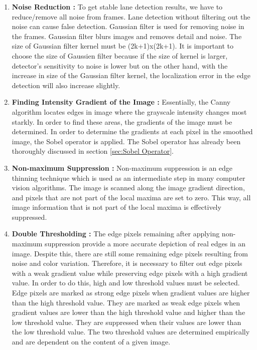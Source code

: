\begin{enumerate}
\item \textbf{Noise Reduction : } To get stable lane detection results, we have to reduce/remove all noise from frames. Lane detection without filtering out the noise can cause false detection. Gaussian filter is used for removing noise in the frames. Gaussian filter blurs images and removes detail and noise. The size of Gaussian filter kernel must be (2k+1)x(2k+1). It is important to choose the size of Gaussien filter because if the size of kernel is larger, detector's sensitivity to noise is lower but on the other hand, with the increase in size of the Gaussian filter kernel, the localization error in the edge detection will also increase slightly. \cite{Canny_Edge_Detector}



\item \textbf{Finding Intensity Gradient of the Image : } Essentially, the Canny algorithm locates edges in image where the grayscale intensity changes most starkly. In order to find these areas, the gradients of the image must be determined. In order to determine the gradients at each pixel in the smoothed image, the Sobel operator is applied. The Sobel operator has already been thoroughly discussed in section \ref{sec:Sobel Operator}.

\item \textbf{Non-maximum Suppression : } Non-maximum suppression is an edge thinning technique which is used as an intermediate step in many computer vision algorithms. The image is scanned along the image gradient direction, and pixels that are not part of the local maxima are set to zero. This way, all image information that is not part of the local maxima is effectively suppressed.

\item \textbf{Double Thresholding : } The edge pixels remaining after applying non-maximum suppression provide a more accurate depiction of real edges in an image. Despite this, there are still some remaining edge pixels resulting from noise and color variation. Therefore, it is necessary to filter out edge pixels with a weak gradient value while preserving edge pixels with a high gradient value. In order to do this, high and low threshold values must be selected. Edge pixels are marked as strong edge pixels when gradient values are higher than the high threshold value. They are marked as weak edge pixels when gradient values are lower than the high threshold value and higher than the low threshold value. They are suppressed when their values are lower than the low threshold value. The two threshold values are determined empirically and are dependent on the content of a given image.



\end{enumerate}

